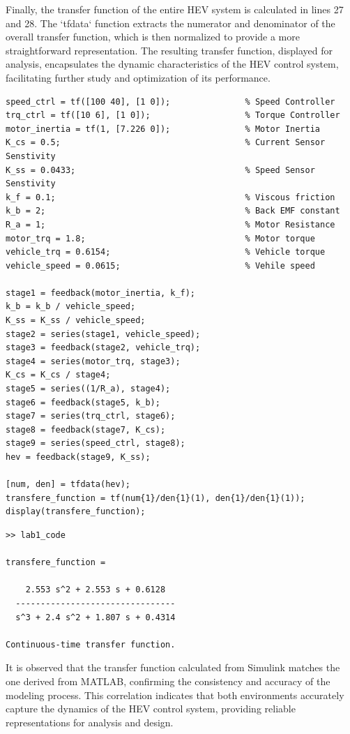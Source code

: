 \documentclass[a4paper, 12pt, english]{article}
\begin{document}
Finally, the transfer function of the entire HEV system is calculated in lines 27 and 28. The `tfdata` function extracts the numerator and denominator of the overall transfer function, which is then normalized to provide a more straightforward representation. The resulting transfer function, displayed for analysis, encapsulates the dynamic characteristics of the HEV control system, facilitating further study and optimization of its performance. \\
\begin{lstlisting}[style=matlab,caption={Matlab code},captionpos=b]
speed_ctrl = tf([100 40], [1 0]);               % Speed Controller
trq_ctrl = tf([10 6], [1 0]);                   % Torque Controller
motor_inertia = tf(1, [7.226 0]);               % Motor Inertia
K_cs = 0.5;                                     % Current Sensor Senstivity
K_ss = 0.0433;                                  % Speed Sensor Senstivity
k_f = 0.1;                                      % Viscous friction
k_b = 2;                                        % Back EMF constant
R_a = 1;                                        % Motor Resistance
motor_trq = 1.8;                                % Motor torque
vehicle_trq = 0.6154;                           % Vehicle torque
vehicle_speed = 0.0615;                         % Vehile speed

stage1 = feedback(motor_inertia, k_f);
k_b = k_b / vehicle_speed;
K_ss = K_ss / vehicle_speed;
stage2 = series(stage1, vehicle_speed);
stage3 = feedback(stage2, vehicle_trq);
stage4 = series(motor_trq, stage3);
K_cs = K_cs / stage4;
stage5 = series((1/R_a), stage4);
stage6 = feedback(stage5, k_b);
stage7 = series(trq_ctrl, stage6);
stage8 = feedback(stage7, K_cs);
stage9 = series(speed_ctrl, stage8);
hev = feedback(stage9, K_ss);

[num, den] = tfdata(hev);
transfere_function = tf(num{1}/den{1}(1), den{1}/den{1}(1));
display(transfere_function);
\end{lstlisting}

\begin{lstlisting}[style=commandstyle,caption={Transfer function},captionpos=b]
>> lab1_code

transfere_function =
 
    2.553 s^2 + 2.553 s + 0.6128
  --------------------------------
  s^3 + 2.4 s^2 + 1.807 s + 0.4314
 
Continuous-time transfer function.
\end{lstlisting}

It is observed that the transfer function calculated from Simulink matches the one derived from MATLAB, confirming the consistency and accuracy of the modeling process. This correlation indicates that both environments accurately capture the dynamics of the HEV control system, providing reliable representations for analysis and design.
\end{document}
